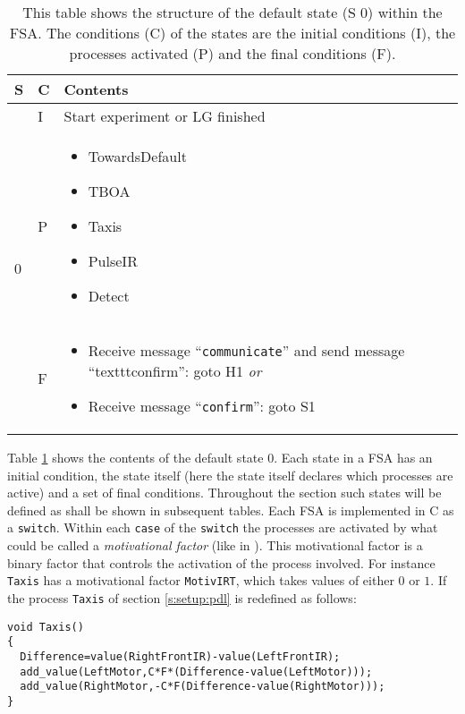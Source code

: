\begin{table}
\begin{tabular}{||p{.5cm}|p{.5cm}|p{8.5cm}||}
\hline\hline
S & C & Contents\\\hline\hline
\multirow{3}{1cm}{0} & I & Start experiment or LG finished\\\cline{2-3}
 & P & \begin{itemize}
\item TowardsDefault
\item TBOA
\item Taxis
\item PulseIR
\item Detect
\end{itemize}\\\cline{2-3}
 & F & \begin{itemize}
\item Receive message ``\texttt{communicate}'' and send message ``texttt{confirm}'': goto H1 {\em or}
\item Receive message ``\texttt{confirm}'': goto S1
\end{itemize}\\\hline\hline
\end{tabular}
\caption{This table shows the structure of the default state (S 0) within the FSA. The conditions (C) of the states are the initial conditions (I), the processes activated (P) and the final conditions (F).}
\label{t:s0}
\end{table}

\p
Table \ref{t:s0} shows the contents of the default state 0. Each state in a FSA has an initial condition, the state itself (here the state itself declares which processes are active) and a set of final conditions. Throughout the section such states will be defined as shall be shown in subsequent tables. Each FSA is implemented in C as a \texttt{switch}. Within each \texttt{case} of the \texttt{switch} the processes are activated by what could be called a {\em motivational factor} (like in \cite{steels:1996c}). This motivational factor is a binary factor that controls the activation of the process involved. For instance \texttt{Taxis} has a motivational factor \texttt{MotivIRT}, which takes values of either $0$ or $1$. If the process \texttt{Taxis} of section \ref{s:setup:pdl} is redefined as follows:

\p
\begin{verbatim}
void Taxis()
{
  Difference=value(RightFrontIR)-value(LeftFrontIR);
  add_value(LeftMotor,C*F*(Difference-value(LeftMotor)));
  add_value(RightMotor,-C*F(Difference-value(RightMotor)));
}
\end{verbatim}

